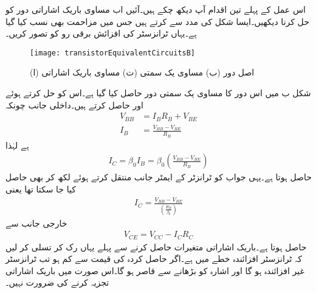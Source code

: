 اس عمل کے پہلے تین اقدام آپ دیکھ چکے ہیں۔آئیں اب مساوی باریک اشاراتی دور کو حل کرنا دیکھیں۔ایسا شکل   کی مدد سے کرتے ہیں جس میں مزاحمت  بھی نسب کیا گیا ہے۔یہاں ٹرانزسٹر کی افزائش برقی رو کو  تصور کریں۔

\begin{figure}
\centering
\texttt{[image: transistorEquivalentCircuitsB]}
\caption{ (ا) اصل دور (ب) مساوی یک سمتی (ت) مساوی باریک اشاراتی}
\label{شکل_ٹرانزسٹر_کے_مساوی_ادوار_ب}
\end{figure}
شکل  ب میں اس دور کا مساوی یک سمتی دور حاصل کیا گیا ہے۔اس کو حل کرتے ہوئے  اور   حاصل کرتے ہیں۔داخلی جانب چونکہ
\begin{align*}
V_{BB}&=I_B R_B + V_{BE}\\
I_B&=\frac{V_{BB}-V_{BE}}{R_B}
\end{align*}
ہے لہٰذا
\begin{align}
I_C = \beta_0 I_B = \beta_0 \left (\frac{V_{BB}-V_{BE}}{R_B} \right )
\end{align}
حاصل ہوتا ہے۔یہی جواب  کو ٹرانزٹر کے ایمٹر جانب منتقل کرتے ہوئے  لکھ کر بھی حاصل کیا جا سکتا تھا یعنی
\begin{align*}
I_C=\frac{V_{BB}-V_{BE}}{\left(\frac{R_B}{\beta_0} \right )}
\end{align*}
خارجی جانب سے
\begin{align}
V_{CE}=V_{CC}-I_C R_C
\end{align}
حاصل ہوتا ہے۔باریک اشاراتی متغیرات حاصل کرنے سے پہلے یہاں رک کر تسلی کر لیں کہ ٹرانزسٹر افزائندہ خطے میں ہے۔اگر حاصل کردہ  کی قیمت  سے کم ہو تب ٹرانزسٹر غیر افزائندہ ہو گا اور اشارہ کو بڑھانے سے قاصر ہو گا۔اس صورت میں باریک اشاراتی تجزیہ کرنے کی ضرورت نہیں۔

